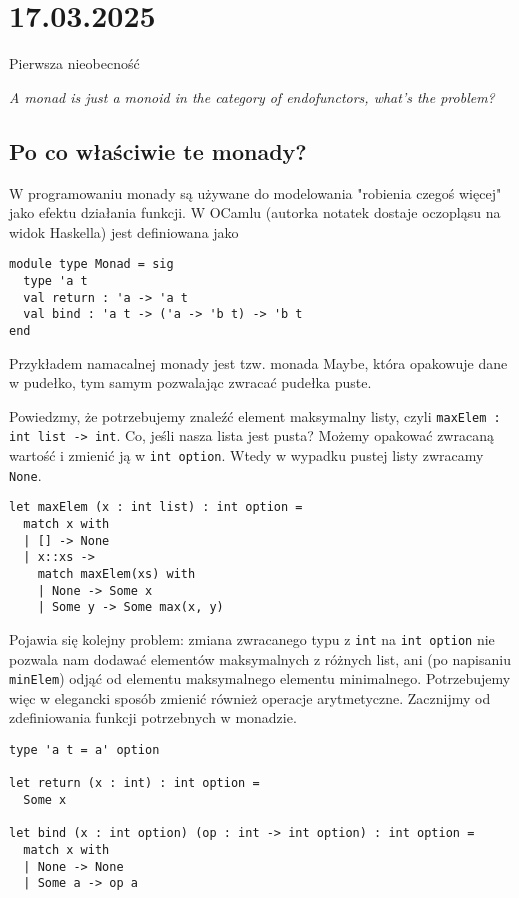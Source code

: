 \section{17.03.2025}{Pierwsza nieobecność}

\begin{adjustwidth}{200pt}{0pt}
\begin{flushright}\slshape
  A monad is just a monoid in the category of endofunctors, what's the problem?
\end{flushright}
\end{adjustwidth}

\subsection{Po co właściwie te monady?}

W programowaniu monady są używane do modelowania "robienia czegoś więcej" jako efektu działania funkcji. W OCamlu (autorka notatek dostaje oczopląsu na widok Haskella) jest definiowana jako

\begin{lstlisting}
module type Monad = sig
  type 'a t
  val return : 'a -> 'a t
  val bind : 'a t -> ('a -> 'b t) -> 'b t
end
\end{lstlisting}
Przykładem namacalnej monady jest tzw. monada Maybe, która opakowuje dane w pudełko, tym samym pozwalając zwracać pudełka puste. 

Powiedzmy, że potrzebujemy znaleźć element maksymalny listy, czyli \lstinline{maxElem : int list -> int}. Co, jeśli nasza lista jest pusta? Możemy opakować zwracaną wartość i zmienić ją w \lstinline{int option}. Wtedy w wypadku pustej listy zwracamy \lstinline{None}. 

\begin{lstlisting}
let maxElem (x : int list) : int option = 
  match x with 
  | [] -> None 
  | x::xs -> 
    match maxElem(xs) with 
    | None -> Some x
    | Some y -> Some max(x, y)
\end{lstlisting}

Pojawia się kolejny problem: zmiana zwracanego typu z \lstinline{int} na \lstinline{int option} nie pozwala nam dodawać elementów maksymalnych z różnych list, ani (po napisaniu \lstinline{minElem}) odjąć od elementu maksymalnego elementu minimalnego. Potrzebujemy więc w elegancki sposób zmienić również operacje arytmetyczne. Zacznijmy od zdefiniowania funkcji potrzebnych w monadzie.

\begin{lstlisting}
type 'a t = a' option

let return (x : int) : int option = 
  Some x

let bind (x : int option) (op : int -> int option) : int option = 
  match x with 
  | None -> None
  | Some a -> op a
\end{lstlisting}

